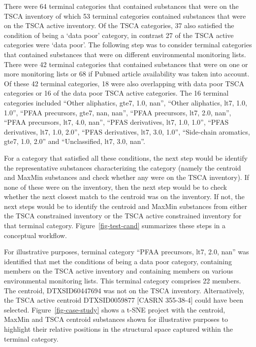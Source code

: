 \documentclass[
  super,
  preprint,
  3p]{elsarticle}
\begin{document}
There were 64 terminal categories that contained substances that were on
the TSCA inventory of which 53 terminal categories contained substances
that were on the TSCA active inventory. Of the TSCA categories, 37 also
satisfied the condition of being a `data poor' category, in contrast 27
of the TSCA active categories were `data poor'. The following step was
to consider terminal categories that contained substances that were on
different environmental monitoring lists. There were 42 terminal
categories that contained substances that were on one or more monitoring
lists or 68 if Pubmed article availability was taken into account. Of
these 42 terminal categories, 18 were also overlapping with data poor
TSCA categories or 16 of the data poor TSCA active categories. The 16
terminal categories included ``Other aliphatics, gte7, 1.0, nan'',
``Other aliphatics, lt7, 1.0, 1.0'', ``PFAA precursors, gte7, nan,
nan'', ``PFAA precursors, lt7, 2.0, nan'', ``PFAA precursors, lt7, 4.0,
nan'', ``PFAS derivatives, lt7, 1.0, 1.0'', ``PFAS derivatives, lt7,
1.0, 2.0'', ``PFAS derivatives, lt7, 3.0, 1.0'', ``Side-chain aromatics,
gte7, 1.0, 2.0'' and ``Unclassified, lt7, 3.0, nan''.

For a category that satisfied all these conditions, the next step would
be identify the representative substances characterizing the category
(namely the centroid and MaxMin substances and check whether any were on
the TSCA inventory). If none of these were on the inventory, then the
next step would be to check whether the next closest match to the
centroid was on the inventory. If not, the next steps would be to
identify the centroid and MaxMin substances from either the TSCA
constrained inventory or the TSCA active constrained inventory for that
terminal category. Figure~\ref{fig-test-cand} summarizes these steps in
a conceptual workflow.

For illustrative purposes, terminal category ``PFAA precursors, lt7,
2.0, nan'' was identified that met the conditions of being a data poor
category, containing members on the TSCA active inventory and containing
members on various environmental monitoring lists. This terminal
category comprises 22 members. The centroid, DTXSID60447694 was not on
the TSCA inventory. Alternatively, the TSCA active centroid
DTXSID0059877 {[}CASRN 355-38-4{]} could have been selected.
Figure~\ref{fig-case-study} shows a t-SNE project with the centroid,
MaxMin and TSCA centroid substances shown for illustrative purposes to
highlight their relative positions in the structural space captured
within the terminal category.
\end{document}
